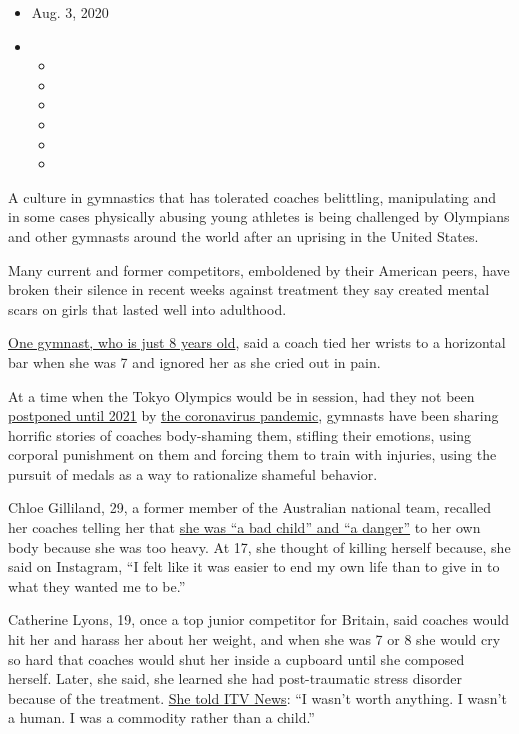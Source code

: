 \begin{itemize}
\item
  Aug. 3, 2020
\item
  \begin{itemize}
  \item
  \item
  \item
  \item
  \item
  \item
  \end{itemize}
\end{itemize}

A culture in gymnastics that has tolerated coaches belittling,
manipulating and in some cases physically abusing young athletes is
being challenged by Olympians and other gymnasts around the world after
an uprising in the United States.

Many current and former competitors, emboldened by their American peers,
have broken their silence in recent weeks against treatment they say
created mental scars on girls that lasted well into adulthood.

\href{https://www.itv.com/news/2020-07-07/girl-8-describes-bullying-by-gymnastics-coaches-as-review-is-pledged}{One
gymnast, who is just 8 years old}, said a coach tied her wrists to a
horizontal bar when she was 7 and ignored her as she cried out in pain.

At a time when the Tokyo Olympics would be in session, had they not been
\href{https://www.nytimes3xbfgragh.onion/2020/03/24/sports/olympics/coronavirus-summer-olympics-postponed.html}{postponed
until 2021} by
\href{https://www.nytimes3xbfgragh.onion/news-event/coronavirus}{the
coronavirus pandemic}, gymnasts have been sharing horrific stories of
coaches body-shaming them, stifling their emotions, using corporal
punishment on them and forcing them to train with injuries, using the
pursuit of medals as a way to rationalize shameful behavior.

Chloe Gilliland, 29, a former member of the Australian national team,
recalled her coaches telling her that
\href{https://7news.com.au/sport/gymnastics/how-fat-shaming-drove-aussie-gymnast-to-breaking-point-c-1186590}{she
was ``a bad child'' and ``a danger''} to her own body because she was
too heavy. At 17, she thought of killing herself because, she said on
Instagram, ``I felt like it was easier to end my own life than to give
in to what they wanted me to be.''

Catherine Lyons, 19, once a top junior competitor for Britain, said
coaches would hit her and harass her about her weight, and when she was
7 or 8 she would cry so hard that coaches would shut her inside a
cupboard until she composed herself. Later, she said, she learned she
had post-traumatic stress disorder because of the treatment.
\href{https://www.itv.com/news/2020-07-22/truth-gives-power-to-abused-gymnasts}{She
told ITV News}: ``I wasn't worth anything. I wasn't a human. I was a
commodity rather than a child.''

